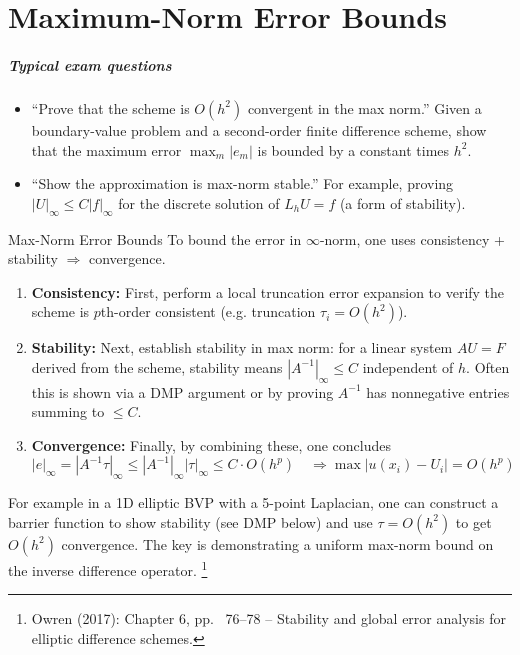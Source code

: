 \documentclass[a4paper,11pt]{report}
\begin{document}
\chapter{Maximum-Norm Error Bounds}

\paragraph{Typical exam questions}
\begin{itemize}
    \item \enquote{Prove that the scheme is $O(h^2)$ convergent in the max norm.} Given a boundary-value problem and a second-order finite difference scheme, show that the maximum error $\max_m |e_m|$ is bounded by a constant times $h^2$.
    \item \enquote{Show the approximation is max-norm stable.} For example, proving $|U|_{\infty} \le C|f|_{\infty}$ for the discrete solution of $L_h U = f$ (a form of stability).
\end{itemize}

\begin{outline}{Max-Norm Error Bounds}{}
    To bound the error in $\infty$-norm, one uses consistency + stability $\Rightarrow$ convergence.

    \begin{enumerate}
        \item \textbf{Consistency:} First, perform a local truncation error expansion to verify the scheme is $p$th-order consistent (e.g. truncation $\tau_i = O(h^2)$).
        \item \textbf{Stability:} Next, establish stability in max norm: for a linear system $A U = F$ derived from the scheme, stability means $|A^{-1}|_{\infty} \le C$ independent of $h$.
              Often this is shown via a DMP argument or by proving $A^{-1}$ has nonnegative entries summing to $\le C$.
        \item \textbf{Convergence:} Finally, by combining these, one concludes
              $$
                  |e|_{\infty} = |A^{-1}\tau|_{\infty} \le |A^{-1}|_{\infty}|\tau|_{\infty} \le C\cdot O(h^p) \quad \Longrightarrow \max|u(x_i)-U_i|=O(h^p)
              $$
    \end{enumerate}
\end{outline}
For example in a 1D elliptic BVP with a 5-point Laplacian, one can construct a barrier function to show stability (see DMP below) and use $\tau=O(h^2)$ to get $O(h^2)$ convergence.
The key is demonstrating a uniform max-norm bound on the inverse difference operator.
\footnote{Owren (2017): Chapter 6, pp. ~76--78 -- Stability and global error analysis for elliptic difference schemes.}
\end{document}
